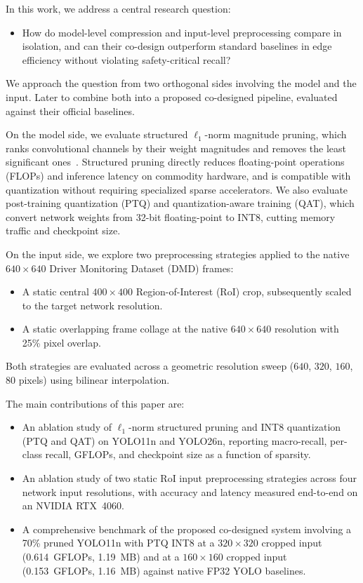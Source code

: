 \documentclass[conference]{IEEEtran}
\begin{document}
In this work, we address a central research question:
\begin{itemize}
    \item How do model-level compression and input-level preprocessing compare in isolation, and can their co-design outperform standard baselines in edge efficiency without violating safety-critical recall?
\end{itemize}

We approach the question from two orthogonal sides involving the model and the input. Later to combine both into a proposed co-designed pipeline, evaluated against their official baselines.

On the model side, we evaluate structured $\ell_1$-norm magnitude pruning, which ranks convolutional channels by their weight magnitudes and removes the least significant ones~\cite{b9}. Structured pruning directly reduces floating-point operations (FLOPs) and inference latency on commodity hardware, and is compatible with quantization without requiring specialized sparse accelerators. We also evaluate post-training quantization (PTQ) and quantization-aware training (QAT), which convert network weights from 32-bit floating-point to INT8, cutting memory traffic and checkpoint size.

On the input side, we explore two preprocessing strategies applied to the native $640\times640$ Driver Monitoring Dataset (DMD) frames:
\begin{itemize}
    \item A static central $400\times400$ Region-of-Interest (RoI) crop, subsequently scaled to the target network resolution.
    \item A static overlapping frame collage at the native $640\times640$ resolution with 25\% pixel overlap.
\end{itemize}
Both strategies are evaluated across a geometric resolution sweep ($640$, $320$, $160$, $80$ pixels) using bilinear interpolation.

The main contributions of this paper are:
\begin{itemize}
    \item An ablation study of $\ell_1$-norm structured pruning and INT8 quantization (PTQ and QAT) on YOLO11n and YOLO26n, reporting macro-recall, per-class recall, GFLOPs, and checkpoint size as a function of sparsity.
    \item An ablation study of two static RoI input preprocessing strategies across four network input resolutions, with accuracy and latency measured end-to-end on an NVIDIA RTX~4060.
    \item A comprehensive benchmark of the proposed co-designed system involving a 70\% pruned YOLO11n with PTQ INT8 at a $320\times320$ cropped input (0.614~GFLOPs, 1.19~MB) and at a $160\times160$ cropped input (0.153~GFLOPs, 1.16~MB) against native FP32 YOLO baselines.
\end{itemize}
\end{document}
